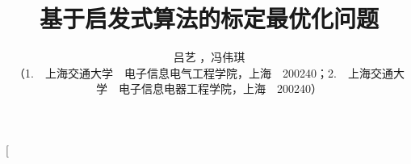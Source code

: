 \documentclass[10.5pt,twocolumn]{jbuaa}
\begin{document}
\title{
\vspace{1cm} \erhao\hei 基于启发式算法的标定最优化问题 \vspace{-0.2cm}
}

\author{
\sihao\fang 吕艺 ，冯伟琪 \\[0.1cm]
\liuhao （1.~~上海交通大学~~电子信息电气工程学院，上海~~200240；2.~~上海交通大学~~电子信息电器工程学院，上海~~200240）
}

\date{}  %
\twocolumn[
\end{document}
